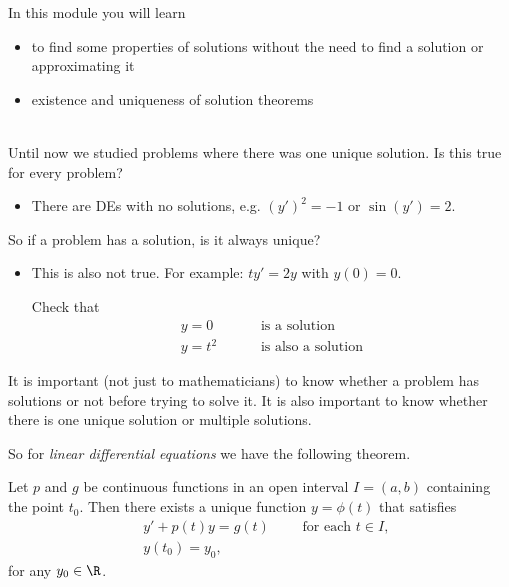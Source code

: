 In this module you will learn
\begin{itemize}
	\item to find some properties of solutions without the need to find a solution or approximating it
	\item existence and uniqueness of solution theorems
\end{itemize}

\hfill \\


Until now we studied problems where there was one unique solution. Is this true for every problem?

\begin{itemize}
\item There are DEs with no solutions, e.g. $(y')^2  =  -1$ or $\sin(y') = 2$.
\end{itemize}

So if a problem has a solution, is it always unique?

\begin{itemize}
\item This is also not true. For example: $t y' = 2y$ with $y(0)=0$.

Check that
\begin{align*}
y=0 \qquad & \text{ is a solution} \\
y = t^2 \qquad & \text{ is also a solution}
\end{align*}
\end{itemize}


It is important (not just to mathematicians) to know whether a problem has solutions or not before trying to solve it. 
It is also important to know whether there is one unique solution or multiple solutions.

So for \emph{linear differential equations} we have the following theorem.

\begin{theorem}
Let $p$ and $g$ be continuous functions in an open interval $I = (a,b)$ containing the point $t_0$.
Then there exists a unique function $y=\phi(t)$ that satisfies
\begin{align*}
& y' + p(t) y = g(t) \qquad \text{ for each $t \in I$,} \\
& y(t_0) = y_0,
\end{align*}
for any $y_0 \in \R$.
\end{theorem}

